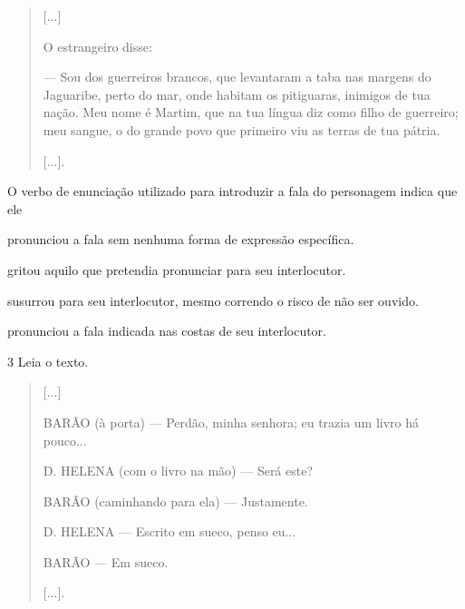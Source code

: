 \begin{quote}
{[}...{]}

O estrangeiro disse:

--- Sou dos guerreiros brancos, que levantaram a taba nas margens do
Jaguaribe, perto do mar, onde habitam os pitiguaras, inimigos de tua
nação. Meu nome é Martim, que na tua língua diz como filho de guerreiro;
meu sangue, o do grande povo que primeiro viu as terras de tua pátria.

{[}...{]}.

\end{quote}

O verbo de enunciação utilizado para introduzir a fala do personagem indica que ele

\begin{escolha}
\item pronunciou a fala sem nenhuma forma de expressão específica.

\item gritou aquilo que pretendia pronunciar para seu interlocutor.

\item susurrou para seu interlocutor, mesmo correndo o risco de não ser ouvido.

\item pronunciou a fala indicada nas costas de seu interlocutor.
\end{escolha}


\num{3} Leia o texto.

\begin{quote}
{[}...{]}

BARÃO (à porta) --- Perdão, minha senhora; eu trazia um livro há
pouco...

D. HELENA (com o livro na mão) --- Será este?

BARÃO (caminhando para ela) --- Justamente.

D. HELENA --- Escrito em sueco, penso eu...

BARÃO --- Em sueco.

{[}...{]}.
\end{quote}

